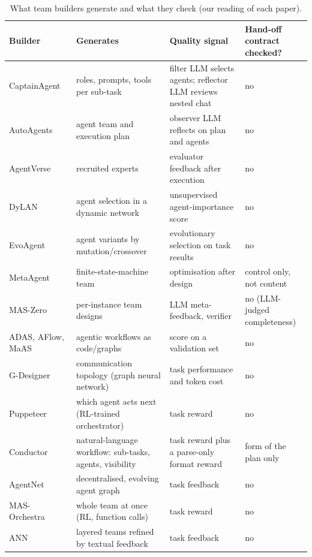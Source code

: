 \documentclass[10pt,a4paper]{article}
\begin{document}
\begin{table}[!htb]
\centering\small
\caption{What team builders generate and what they check (our reading of each paper).}
\label{tab:builders}
\begin{tabularx}{\textwidth}{@{}l X X X@{}}
\toprule
\rowcolor{white}Builder & Generates & Quality signal & Hand-off contract checked? \\
\midrule
CaptainAgent~\cite{song2024captain} & roles, prompts, tools per sub-task & filter LLM selects agents; reflector LLM reviews nested chat & no \\
AutoAgents~\cite{chen2024autoagents} & agent team and execution plan & observer LLM reflects on plan and agents & no \\
AgentVerse~\cite{chen2024agentverse} & recruited experts & evaluator feedback after execution & no \\
DyLAN~\cite{liu2024dylan} & agent selection in a dynamic network & unsupervised agent-importance score & no \\
EvoAgent~\cite{yuan2025evoagent} & agent variants by mutation/crossover & evolutionary selection on task results & no \\
MetaAgent~\cite{zhang2025metaagent} & finite-state-machine team & optimisation after design & control only, not content \\
MAS-Zero~\cite{ke2025maszero} & per-instance team designs & LLM meta-feedback, verifier & no (LLM-judged completeness) \\
ADAS, AFlow, MaAS~\cite{hu2025adas,zhang2025aflow,zhang2025maas} & agentic workflows as code/graphs & score on a validation set & no \\
G-Designer~\cite{zhang2025gdesigner} & communication topology (graph neural network) & task performance and token cost & no \\
Puppeteer~\cite{dang2025puppeteer} & which agent acts next (RL-trained orchestrator) & task reward & no \\
Conductor~\cite{nielsen2026conductor} & natural-language workflow: sub-tasks, agents, visibility & task reward plus a parse-only format reward & form of the plan only \\
AgentNet~\cite{yang2025agentnet} & decentralised, evolving agent graph & task feedback & no \\
MAS-Orchestra~\cite{ke2026masorchestra} & whole team at once (RL, function calls) & task reward & no \\
ANN~\cite{ma2026ann} & layered teams refined by textual feedback & task feedback & no \\
\bottomrule
\end{tabularx}
\end{table}
\end{document}
